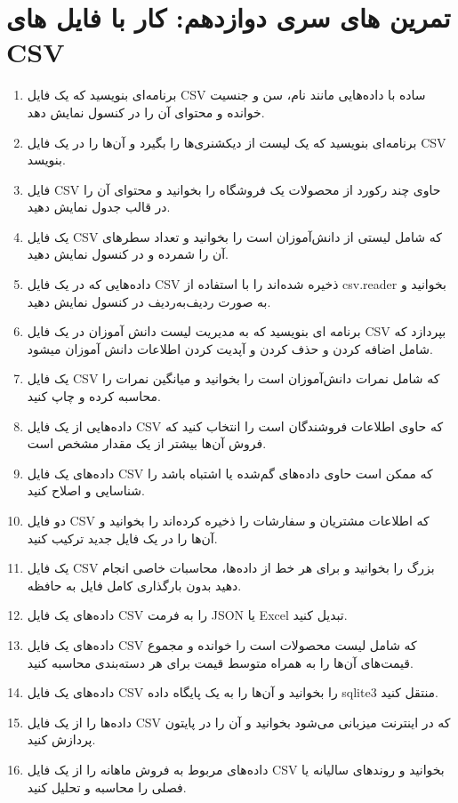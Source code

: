 \documentclass[b5paper,12pt]{article}
\begin{document}
	\section*{تمرین های سری دوازدهم: کار با فایل های CSV}
	\begin{enumerate}
		\item برنامه‌ای بنویسید که یک فایل CSV ساده با داده‌هایی مانند نام، سن و جنسیت خوانده و محتوای آن را در کنسول نمایش دهد.
		\item برنامه‌ای بنویسید که یک لیست از دیکشنری‌ها را بگیرد و آن‌ها را در یک فایل CSV بنویسد.
		\item فایل CSV حاوی چند رکورد از محصولات یک فروشگاه را بخوانید و محتوای آن را در قالب جدول نمایش دهید.
		\item یک فایل CSV که شامل لیستی از دانش‌آموزان است را بخوانید و تعداد سطرهای آن را شمرده و در کنسول نمایش دهید.
		\item داده‌هایی که در یک فایل CSV ذخیره شده‌اند را با استفاده از csv.reader بخوانید و به صورت ردیف‌به‌ردیف در کنسول نمایش دهید.
		\item برنامه ای بنویسید که به مدیریت لیست دانش آموزان در یک فایل CSV بپردازد که شامل اضافه کردن و حذف کردن و آپدیت کردن اطلاعات دانش آموزان میشود.
		\item یک فایل CSV که شامل نمرات دانش‌آموزان است را بخوانید و میانگین نمرات را محاسبه کرده و چاپ کنید.
		\item داده‌هایی از یک فایل CSV که حاوی اطلاعات فروشندگان است را انتخاب کنید که فروش آن‌ها بیشتر از یک مقدار مشخص است.
		\item داده‌های یک فایل CSV که ممکن است حاوی داده‌های گم‌شده یا اشتباه باشد را شناسایی و اصلاح کنید.
		\item دو فایل CSV که اطلاعات مشتریان و سفارشات را ذخیره کرده‌اند را بخوانید و آن‌ها را در یک فایل جدید ترکیب کنید.
		\item یک فایل CSV بزرگ را بخوانید و برای هر خط از داده‌ها، محاسبات خاصی انجام دهید بدون بارگذاری کامل فایل به حافظه.
		\item داده‌های یک فایل CSV را به فرمت JSON یا Excel تبدیل کنید.
		\item داده‌های یک فایل CSV که شامل لیست محصولات است را خوانده و مجموع قیمت‌های آن‌ها را به همراه متوسط قیمت برای هر دسته‌بندی محاسبه کنید.
		\item داده‌های یک فایل CSV را بخوانید و آن‌ها را به یک پایگاه داده sqlite3 منتقل کنید.
		\item داده‌ها را از یک فایل CSV که در اینترنت میزبانی می‌شود بخوانید و آن را در پایتون پردازش کنید.
		\item داده‌های مربوط به فروش ماهانه را از یک فایل CSV بخوانید و روندهای سالیانه یا فصلی را محاسبه و تحلیل کنید.

\end{enumerate}
\end{document}
